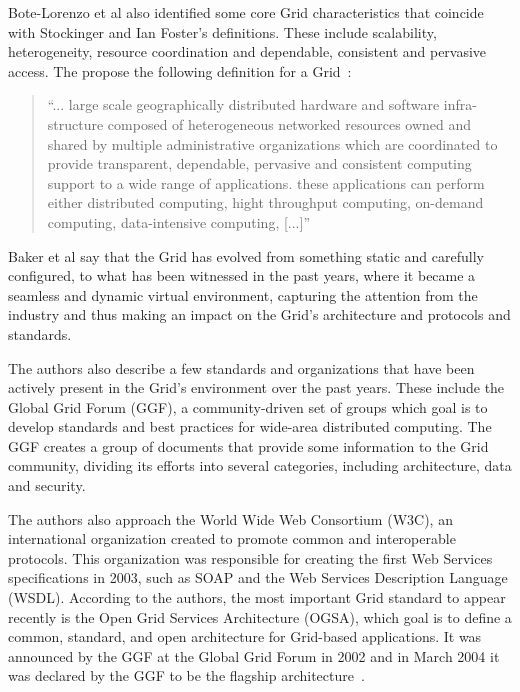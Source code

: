 Bote-Lorenzo et al also identified some core Grid characteristics that coincide with Stockinger and Ian Foster's definitions. These include scalability, heterogeneity, resource coordination and dependable, consistent and pervasive access. The propose the following definition for a Grid~\cite{bote-lorenzo}:

\begin{quote}
``... large scale geographically distributed hardware and software infra-structure composed of heterogeneous networked resources owned and shared by multiple administrative organizations which are coordinated to provide transparent, dependable, pervasive and consistent computing support to a wide range of applications. these applications can perform either distributed computing, hight throughput computing, on-demand computing, data-intensive computing, [...]''
\end{quote}

Baker et al say that the Grid has evolved from something static and carefully configured, to what has been witnessed in the past years, where it became a seamless and dynamic virtual environment, capturing the attention from the industry and thus making an impact on the Grid's architecture and protocols and standards. 

The authors also describe a few standards and organizations that have been actively present in the Grid's environment over the past years. These include the Global Grid Forum (GGF), a community-driven set of groups which goal is to develop standards and best practices for wide-area distributed computing. The GGF creates a group of documents that provide some information to the Grid community, dividing its efforts into several categories, including architecture, data and security.

The authors also approach the World Wide Web Consortium (W3C), an international organization created to promote common and interoperable protocols. This organization was responsible for creating the first Web Services specifications in 2003, such as SOAP and the Web Services Description Language (WSDL).
According to the authors, the most important Grid standard to appear recently is the Open Grid Services Architecture (OGSA), which goal is to define a common, standard, and open architecture for Grid-based applications. It was announced by the GGF at the Global Grid Forum in 2002 and in March 2004 it was declared by the GGF to be the flagship architecture~\cite{grid-standards}.


